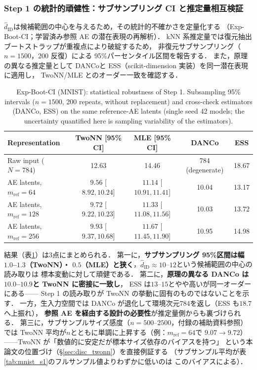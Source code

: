 \documentclass[11pt,a4paper]{jsarticle}
\newcommand{\hatdID}{\hat{d}_{\mathrm{ID}}}
\begin{document}
\subsubsection{Step 1 の統計的頑健性：サブサンプリング CI と推定量相互検証}
\label{sec:exp_mnist_ci}

$\hatdID$は候補範囲の中心を与えるため，その統計的不確かさを定量化する
（Exp-Boot-CI；学習済み参照 AE の潜在表現の再解析）．
kNN 系推定量では復元抽出ブートストラップが重複点により破綻するため，
非復元サブサンプリング（$n = 1500$，200 反復）による
95\%パーセンタイル区間を報告する．
また，原理の異なる推定量として DANCo\cite{ceruti2014danco}と
ESS\cite{johnsson2015ess}（scikit-dimension 実装）を同一潜在表現に適用し，
TwoNN/MLE とのオーダー一致を確認する．

\begin{table}[H]
\centering
\caption{Exp-Boot-CI (MNIST): statistical robustness of Step 1.
Subsampling 95\% intervals ($n = 1500$, 200 repeats, without replacement)
and cross-check estimators (DANCo, ESS) on the same reference-AE latents
(single seed 42 models; the uncertainty quantified here is sampling
variability of the estimators).}
\label{tab:boot_ci}
\small
\begin{tabular}{lcccc}
\toprule
Representation & TwoNN [95\% CI] & MLE [95\% CI] & DANCo & ESS \\
\midrule
Raw input ($N = 784$) & 12.63 & 14.46 & 784 (degenerate) & 18.67 \\
\midrule
AE latents, $m_{\mathrm{ref}} = 64$  & $9.56$ [$8.92, 10.24$] & $11.14$ [$10.91, 11.41$] & 10.04 & 13.17 \\
AE latents, $m_{\mathrm{ref}} = 128$ & $9.72$ [$9.22, 10.23$] & $11.33$ [$11.08, 11.56$] & 10.03 & 13.72 \\
AE latents, $m_{\mathrm{ref}} = 256$ & $9.93$ [$9.37, 10.68$] & $11.67$ [$11.45, 11.90$] & 10.95 & 14.98 \\
\bottomrule
\end{tabular}
\end{table}

結果（表\ref{tab:boot_ci}）は3点にまとめられる．
第一に，\textbf{サブサンプリング 95\%区間は幅$1.0$--$1.3$（TwoNN）・
$0.5$（MLE）と狭く}，$\hatdID \approx 10$--$12$という候補範囲の中心の読み取りは
標本変動に対して頑健である．
第二に，\textbf{原理の異なる DANCo は$10.0$--$10.9$と TwoNN に密接に一致し}，
ESS は$13$--$15$とやや高いが同一オーダーにある——
Step 1 の読み取りが TwoNN の挙動に固有のものではないことを示す．
一方，生入力空間では DANCo が退化して環境次元$784$を返し（ESS も$18.7$へ上振れ），
\textbf{参照 AE を経由する設計の必要性}が推定量側からも裏づけられる．
第三に，サブサンプルサイズ感度（$n = 500$--$2500$，付録の補助資料参照）では
TwoNN 平均が$n$とともに単調に上昇する（例：$m_{\mathrm{ref}} = 64$で
$9.07 \to 9.72$）——TwoNN が「数値的に安定だが標本サイズ依存のバイアスを持つ」
という本論文の位置づけ（§\ref{sec:disc_twonn}）を直接例証する
（サブサンプル平均が表\ref{tab:mnist_s1}のフルサンプル値よりわずかに低いのは
このバイアスによる）．
\end{document}
